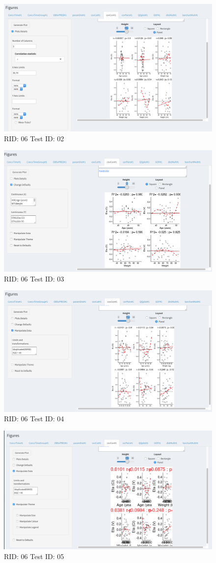 \begin{figure}[H]
\includegraphics[width=.8\textwidth]{screencaps/06-02-1.png}
\caption{RID: 06 Test ID: 02}
\end{figure}
\begin{figure}[H]
\includegraphics[width=.8\textwidth]{screencaps/06-03-1.png}
\caption{RID: 06 Test ID: 03}
\end{figure}
\begin{figure}[H]
\includegraphics[width=.8\textwidth]{screencaps/06-04-1.png}
\caption{RID: 06 Test ID: 04}
\end{figure}
\begin{figure}[H]
\includegraphics[width=.8\textwidth]{screencaps/06-05-1.png}
\caption{RID: 06 Test ID: 05}
\end{figure}
